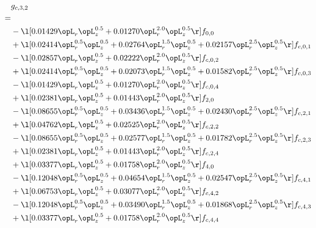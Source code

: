 \begin{alignat}{2} 
\label{eq:g_32_0} 
& g_{c,3,2} \nonumber \\ 
 = \\ 
& - \l[  0.01429 \opL_r \opL_z^{0.5} +  0.01270 \opL_r^{2.0} \opL_z^{0.5}  \r] f_{0,0} \nonumber \\ 
& + \l[  0.02414 \opL_r^{0.5} \opL_z^{0.5} +  0.02764 \opL_r^{1.5} \opL_z^{0.5} +  0.02157 \opL_r^{2.5} \opL_z^{0.5}  \r] f_{c,0,1} \nonumber \\ 
& - \l[  0.02857 \opL_r \opL_z^{0.5} +  0.02222 \opL_r^{2.0} \opL_z^{0.5}  \r] f_{c,0,2} \nonumber \\ 
& + \l[  0.02414 \opL_r^{0.5} \opL_z^{0.5} +  0.02073 \opL_r^{1.5} \opL_z^{0.5} +  0.01582 \opL_r^{2.5} \opL_z^{0.5}  \r] f_{c,0,3} \nonumber \\ 
& - \l[  0.01429 \opL_r \opL_z^{0.5} +  0.01270 \opL_r^{2.0} \opL_z^{0.5}  \r] f_{c,0,4} \nonumber \\ 
& + \l[  0.02381 \opL_r \opL_z^{0.5} +  0.01443 \opL_r^{2.0} \opL_z^{0.5}  \r] f_{2,0} \nonumber \\ 
& - \l[  0.08655 \opL_r^{0.5} \opL_z^{0.5} +  0.03436 \opL_r^{1.5} \opL_z^{0.5} +  0.02430 \opL_r^{2.5} \opL_z^{0.5}  \r] f_{c,2,1} \nonumber \\ 
& + \l[  0.04762 \opL_r \opL_z^{0.5} +  0.02525 \opL_r^{2.0} \opL_z^{0.5}  \r] f_{c,2,2} \nonumber \\ 
& - \l[  0.08655 \opL_r^{0.5} \opL_z^{0.5} +  0.02577 \opL_r^{1.5} \opL_z^{0.5} +  0.01782 \opL_r^{2.5} \opL_z^{0.5}  \r] f_{c,2,3} \nonumber \\ 
& + \l[  0.02381 \opL_r \opL_z^{0.5} +  0.01443 \opL_r^{2.0} \opL_z^{0.5}  \r] f_{c,2,4} \nonumber \\ 
& + \l[  0.03377 \opL_r \opL_z^{0.5} +  0.01758 \opL_r^{2.0} \opL_z^{0.5}  \r] f_{4,0} \nonumber \\ 
& - \l[  0.12048 \opL_r^{0.5} \opL_z^{0.5} +  0.04654 \opL_r^{1.5} \opL_z^{0.5} +  0.02547 \opL_r^{2.5} \opL_z^{0.5}  \r] f_{c,4,1} \nonumber \\ 
& + \l[  0.06753 \opL_r \opL_z^{0.5} +  0.03077 \opL_r^{2.0} \opL_z^{0.5}  \r] f_{c,4,2} \nonumber \\ 
& - \l[  0.12048 \opL_r^{0.5} \opL_z^{0.5} +  0.03490 \opL_r^{1.5} \opL_z^{0.5} +  0.01868 \opL_r^{2.5} \opL_z^{0.5}  \r] f_{c,4,3} \nonumber \\ 
& + \l[  0.03377 \opL_r \opL_z^{0.5} +  0.01758 \opL_r^{2.0} \opL_z^{0.5}  \r] f_{c,4,4} \nonumber \\ 
\end{alignat} 


